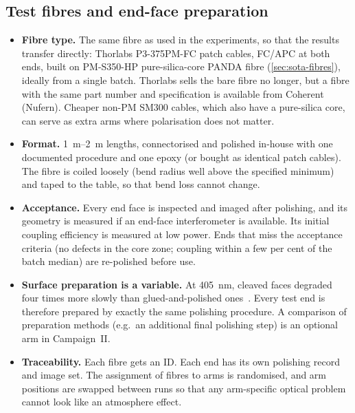 \subsection{Test fibres and end-face preparation}
\begin{itemize}
  \item \textbf{Fibre type.} The same fibre as used in the experiments, so that the results transfer
        directly: Thorlabs P3-375PM-FC patch cables, FC/APC at both ends, built on PM-S350-HP
        pure-silica-core PANDA fibre (\cref{sec:sota-fibres}), ideally from a single batch. Thorlabs
        sells the bare fibre no longer, but a fibre with the same part number and specification is
        available from Coherent (Nufern). Cheaper non-PM SM300 cables, which also have a pure-silica
        core, can serve as extra arms where polarisation does not matter.
  \item \textbf{Format.} \SIrange{1}{2}{m} lengths, connectorised and polished in-house with one
        documented procedure and one epoxy (or bought as identical patch cables). The fibre is coiled
        loosely (bend radius well above the specified minimum) and taped to the table, so that bend
        loss cannot change.
  \item \textbf{Acceptance.} Every end face is inspected and imaged after polishing, and its geometry
        is measured if an end-face interferometer is available. Its initial coupling efficiency is measured
        at low power. Ends that miss the acceptance criteria (no defects in the core zone; coupling
        within a few per cent of the batch median) are re-polished before use.
  \item \textbf{Surface preparation is a variable.} At \SI{405}{nm}, cleaved faces degraded four times
        more slowly than glued-and-polished ones~\cite{Gonschior2013PhD}. Every test end is therefore
        prepared by exactly the same polishing procedure. A comparison of preparation methods (e.g.\ an
        additional final polishing step) is an optional arm in Campaign~II.
  \item \textbf{Traceability.} Each fibre gets an ID. Each end has its own polishing record and image
        set. The assignment of fibres to arms is randomised, and arm positions are swapped between
        runs so that any arm-specific optical problem cannot look like an atmosphere effect.
\end{itemize}

